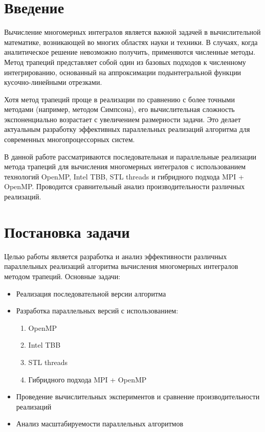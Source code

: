 \documentclass[14pt,a4paper]{extarticle}
\begin{document}
\section{Введение}
Вычисление многомерных интегралов является важной задачей в вычислительной математике, возникающей во многих областях науки и техники. В случаях, когда аналитическое решение невозможно получить, применяются численные методы. Метод трапеций представляет собой один из базовых подходов к численному интегрированию, основанный на аппроксимации подынтегральной функции кусочно-линейными отрезками.

Хотя метод трапеций проще в реализации по сравнению с более точными методами (например, методом Симпсона), его вычислительная сложность экспоненциально возрастает с увеличением размерности задачи. Это делает актуальным разработку эффективных параллельных реализаций алгоритма для современных многопроцессорных систем.

В данной работе рассматриваются последовательная и параллельные реализации метода трапеций для вычисления многомерных интегралов с использованием технологий OpenMP, Intel TBB, STL threads и гибридного подхода MPI + OpenMP. Проводится сравнительный анализ производительности различных реализаций.
\newpage

\section{Постановка задачи}
Целью работы является разработка и анализ эффективности различных параллельных реализаций алгоритма вычисления многомерных интегралов методом трапеций. Основные задачи:

\begin{itemize}
    \item Реализация последовательной версии алгоритма
    \item Разработка параллельных версий с использованием:
    \begin{enumerate}
        \item OpenMP
        \item Intel TBB
        \item STL threads
        \item Гибридного подхода MPI + OpenMP
    \end{enumerate}
    \item Проведение вычислительных экспериментов и сравнение производительности реализаций
    \item Анализ масштабируемости параллельных алгоритмов
\end{itemize}
\newpage
\end{document}

